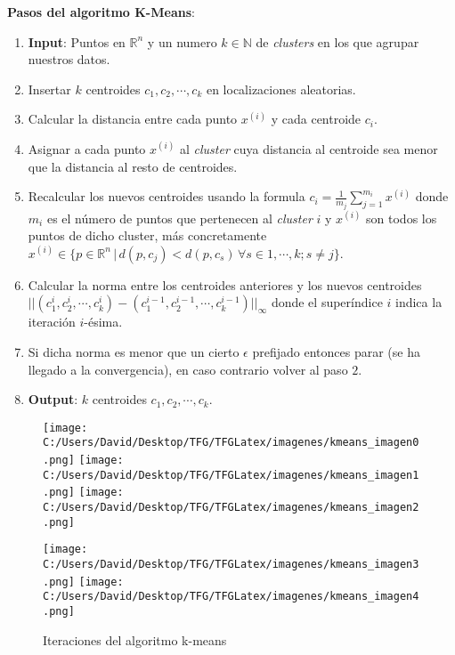 \noindent \textbf{Pasos del algoritmo K-Means}:
\begin{enumerate}
  \item[] \textbf{Input}: Puntos en $\mathds{R}^n$ y un numero $k \in \mathds{N}$ de \textit{clusters}
  en los que agrupar nuestros datos.
  \item Insertar $k$ centroides $c_1, c_2, \cdots, c_k$ en localizaciones aleatorias.
  \item Calcular la distancia entre cada punto $x^{(i)}$ y cada centroide $c_i$.
  \item Asignar a cada punto $x^{(i)}$ al \textit{cluster} cuya distancia al centroide sea menor 
        que la distancia al resto de centroides.
  \item Recalcular los nuevos centroides usando la formula $c_i = \frac{1}{m_j} \sum_{j=1}^{m_i}x^{(i)}$ 
        donde $m_i$ es el número de puntos que pertenecen al \textit{cluster} $i$ y $x^{(i)}$ son 
        todos los puntos de dicho cluster, más concretamente \\
        $x^{(i)} \in \{ p \in \mathds{R}^n \, | \, d(p, c_j) < d(p, c_s) \, \forall s \in 1, \cdots, k; s \neq j \}$.
  \item Calcular la norma entre los centroides anteriores y los nuevos centroides \\
        $ ||(c_1^i, c_2^i, \cdots, c_k^i) - (c_1^{i-1}, c_2^{i-1}, \cdots, c_k^{i-1})||_{\infty} $ 
        donde el superíndice $i$ indica la iteración $i$-ésima.
  \item Si dicha norma es menor que un cierto $\epsilon$ prefijado entonces parar (se ha llegado a la convergencia), 
        en caso contrario volver al paso $2$.
  \item[] \textbf{Output}: $k$ centroides $c_1, c_2, \cdots, c_k$.
\end{enumerate}

\begin{figure}[htp]
  \centering
  \texttt{[image: C:/Users/David/Desktop/TFG/TFGLatex/imagenes/kmeans\_imagen0.png]}\quad
  \texttt{[image: C:/Users/David/Desktop/TFG/TFGLatex/imagenes/kmeans\_imagen1.png]}\quad
  \texttt{[image: C:/Users/David/Desktop/TFG/TFGLatex/imagenes/kmeans\_imagen2.png]}

  \medskip

  \texttt{[image: C:/Users/David/Desktop/TFG/TFGLatex/imagenes/kmeans\_imagen3.png]}\quad
  \texttt{[image: C:/Users/David/Desktop/TFG/TFGLatex/imagenes/kmeans\_imagen4.png]}

  \caption{Iteraciones del algoritmo k-means}
  \label{kmeans_iteraciones} %
\end{figure}

